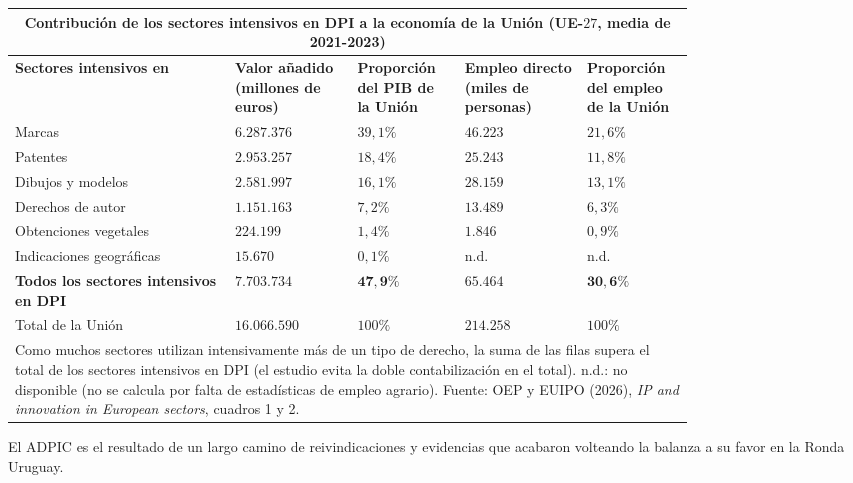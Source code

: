 \documentclass[10pt,a4paper]{article}
\begin{document}
\begin{center}
\scriptsize
\begin{tabular}{|p{0.27\linewidth}|p{0.15\linewidth}|p{0.11\linewidth}|p{0.15\linewidth}|p{0.11\linewidth}|}
\hline
\multicolumn{5}{|c|}{\textbf{Contribución de los sectores intensivos en DPI a la economía de la Unión (UE-$27$, media de 2021-2023)}} \\
\hline
\textbf{Sectores intensivos en} & \textbf{Valor añadido (millones de euros)} & \textbf{Proporción del PIB de la Unión} & \textbf{Empleo directo (miles de personas)} & \textbf{Proporción del empleo de la Unión} \\
\hline
Marcas & $6{.}287{.}376$ & $39,1\%$ & $46{.}223$ & $21,6\%$ \\
\hline
Patentes & $2{.}953{.}257$ & $18,4\%$ & $25{.}243$ & $11,8\%$ \\
\hline
Dibujos y modelos & $2{.}581{.}997$ & $16,1\%$ & $28{.}159$ & $13,1\%$ \\
\hline
Derechos de autor & $1{.}151{.}163$ & $7,2\%$ & $13{.}489$ & $6,3\%$ \\
\hline
Obtenciones vegetales & $224{.}199$ & $1,4\%$ & $1{.}846$ & $0,9\%$ \\
\hline
Indicaciones geográficas & $15{.}670$ & $0,1\%$ & n.d. & n.d. \\
\hline
\textbf{Todos los sectores intensivos en DPI} & $\mathbf{7.703.734}$ & $\mathbf{47,9\%}$ & $\mathbf{65.464}$ & $\mathbf{30,6\%}$ \\
\hline
Total de la Unión & $16{.}066{.}590$ & $100\%$ & $214{.}258$ & $100\%$ \\
\hline
\multicolumn{5}{|p{0.91\linewidth}|}{\tiny Como muchos sectores utilizan intensivamente más de un tipo de derecho, la suma de las filas supera el total de los sectores intensivos en DPI (el estudio evita la doble contabilización en el total). n.d.: no disponible (no se calcula por falta de estadísticas de empleo agrario). Fuente: OEP y EUIPO (2026), \textit{IP and innovation in European sectors}, cuadros 1 y 2.} \\
\hline
\end{tabular}
\end{center}

El ADPIC es el resultado de un largo camino de reivindicaciones y evidencias que acabaron volteando la balanza a su favor en la Ronda Uruguay.
\end{document}
